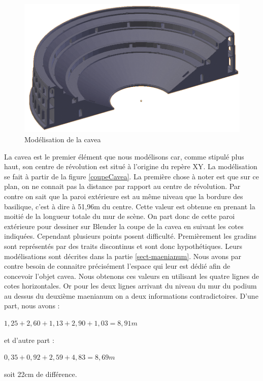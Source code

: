 \begin{figure}[!h]
	\includegraphics[width=\linewidth]{images/modCavea2}
	\caption{Modélisation de la \gls{cavea}} 
	\label{modCavea} 
\end{figure} 

La \gls{cavea} est le premier élément que nous modélisons car, comme stipulé plus haut, son centre de révolution est situé à l'origine du repère XY. La modélisation se fait à partir de la figure \ref{coupeCavea}. La première chose à noter est que sur ce plan, on ne connait pas la distance par rapport au centre de révolution. Par contre on sait que la paroi extérieure est au même niveau que la bordure des \gls{basilique}, c'est à dire à 51,96m du centre. Cette valeur est obtenue en prenant la moitié de la longueur totale du mur de scène. On part donc de cette paroi extérieure pour dessiner sur Blender la coupe de la \gls{cavea} en suivant les cotes indiquées. Cependant plusieurs points posent difficulté. Premièrement les gradins sont représentés par des traits discontinus et sont donc hypothétiques. Leurs modélisations sont décrites dans la partie \ref{sect-maenianum}. Nous avons par contre besoin de connaitre précisément l'espace qui leur est dédié afin de concevoir l'objet cavea. Nous obtenons ces valeurs en utilisant les quatre lignes de cotes horizontales. Or pour les deux lignes arrivant du niveau du mur du podium au dessus du deuxième \gls{maenianum} on a deux informations contradictoires. D'une part, nous avons :
\begin{center}
$1,25+2,60+1,13+2,90+1,03=8,91m$
\end{center}
et d'autre part :
\begin{center}
$0,35+0,92+2,59+4,83=8,69m$
\end{center}
soit 22cm de différence. \\

